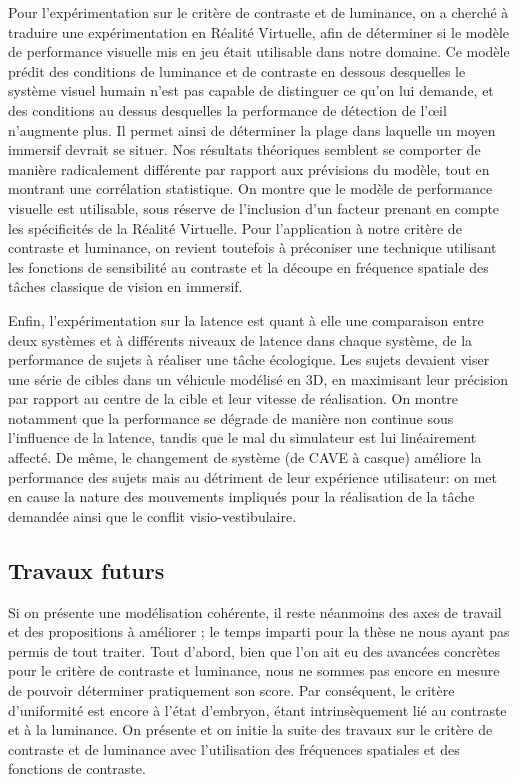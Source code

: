 	\par Pour l'expérimentation sur le critère de contraste et de luminance, on a cherché à traduire une expérimentation en Réalité Virtuelle, afin de déterminer si le modèle de performance visuelle mis en jeu était utilisable dans notre domaine. Ce modèle prédit des conditions de luminance et de contraste en dessous desquelles le système visuel humain n'est pas capable de distinguer ce qu'on lui demande, et des conditions au dessus desquelles la performance de détection de l'œil n'augmente plus. Il permet ainsi de déterminer la plage dans laquelle un moyen immersif devrait se situer. Nos résultats théoriques semblent se comporter de manière radicalement différente par rapport aux prévisions du modèle, tout en montrant une corrélation statistique. On montre que le modèle de performance visuelle est utilisable, sous réserve de l'inclusion d'un facteur prenant en compte les spécificités de la Réalité Virtuelle. Pour l'application à notre critère de contraste et luminance, on revient toutefois à préconiser une technique utilisant les fonctions de sensibilité au contraste et la découpe en fréquence spatiale des tâches classique de vision en immersif.
	
	\par Enfin, l'expérimentation sur la latence est quant à elle une comparaison entre deux systèmes et à différents niveaux de latence dans chaque système, de la performance de sujets à réaliser une tâche écologique. Les sujets devaient viser une série de cibles dans un véhicule modélisé en 3D, en maximisant leur précision par rapport au centre de la cible et leur vitesse de réalisation. On montre notamment que la performance se dégrade de manière non continue sous l'influence de la latence, tandis que le mal du simulateur est lui linéairement affecté. De même, le changement de système (de CAVE à casque) améliore la performance des sujets mais au détriment de leur expérience utilisateur: on met en cause la nature des mouvements impliqués pour la réalisation de la tâche demandée ainsi que le conflit visio-vestibulaire.

	\subsection*{Travaux futurs}
	\par Si on présente une modélisation cohérente, il reste néanmoins des axes de travail et des propositions à améliorer ; le temps imparti pour la thèse ne nous ayant pas permis de tout traiter. Tout d'abord, bien que l'on ait eu des avancées concrètes pour le critère de contraste et luminance, nous ne sommes pas encore en mesure de pouvoir déterminer pratiquement son score. Par conséquent, le critère d'uniformité est encore à l'état d'embryon, étant intrinsèquement lié au contraste et à la luminance. On présente et on initie la suite des travaux sur le critère de contraste et de luminance avec l'utilisation des fréquences spatiales et des fonctions de contraste.
	
